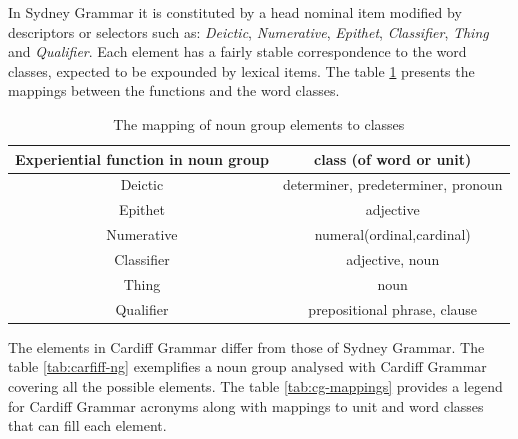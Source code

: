 In Sydney Grammar it is constituted by a head nominal item modified by descriptors or selectors such as: \textit{Deictic}, \textit{Numerative}, \textit{Epithet}, \textit{Classifier}, \textit{Thing} and \textit{Qualifier}. Each element has a fairly stable correspondence to the word classes, expected to be expounded by lexical items. The table \ref{tab:function-pos-mapping} presents the mappings between the functions and the word classes.

\begin{table}[h]
	\begin{tabular}{|c|c|}
		\hline
		\textbf{Experiential function in noun group} & \textbf{class (of word or unit)} \\ \hline
		Deictic                             & determiner, predeterminer, pronoun \\ \hline
		Epithet                             & adjective                    \\ \hline
		Numerative                          & numeral(ordinal,cardinal)    \\ \hline
		Classifier                          & adjective, noun              \\ \hline
		Thing                               & noun                         \\ \hline
		Qualifier                           & prepositional phrase, clause \\ \hline
	\end{tabular}
	\caption{The mapping of noun group elements to classes}
	\label{tab:function-pos-mapping}
\end{table}


The elements in Cardiff Grammar differ from those of Sydney Grammar. The table \ref{tab:carfiff-ng} exemplifies a noun group analysed with Cardiff Grammar covering all the possible elements. The table \ref{tab:cg-mappings} provides a legend for Cardiff Grammar acronyms along with mappings to unit and word classes that can fill each element.

